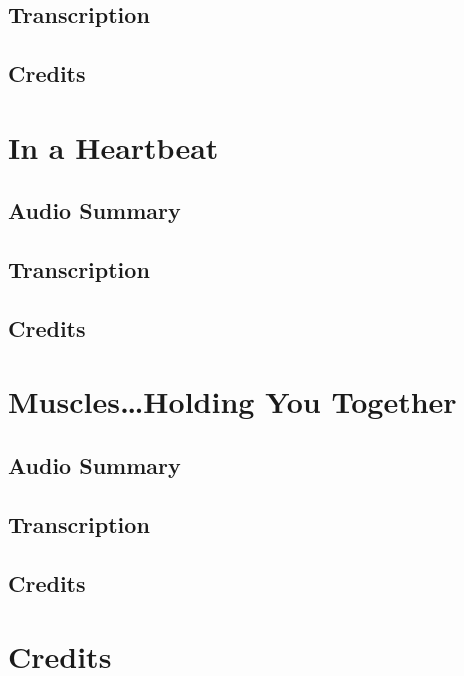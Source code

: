 \subsection{Transcription}

\subsection{Credits}

\section{In a Heartbeat}

\subsection{Audio Summary}

\subsection{Transcription}

\subsection{Credits}

\section{Muscles\dots Holding You Together}

\subsection{Audio Summary}

\subsection{Transcription}

\subsection{Credits}

\section{Credits}